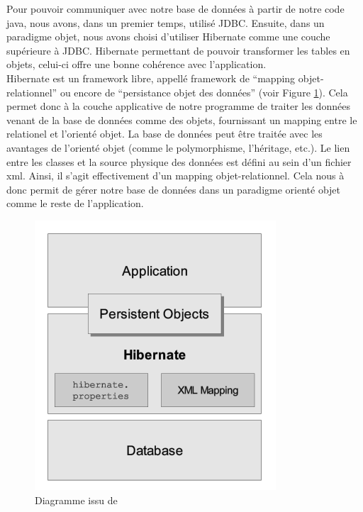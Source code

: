 Pour pouvoir communiquer avec notre base de données à partir de notre code java, nous avons, dans un premier temps, utilisé JDBC. Ensuite, dans un paradigme objet, nous avons  choisi d'utiliser Hibernate comme une couche supérieure à JDBC. Hibernate permettant de pouvoir transformer les tables en objets, celui-ci offre une bonne cohérence avec l'application.\\
\newline
\indent
Hibernate est un framework libre, appellé framework de  \enquote{mapping objet-relationnel} ou encore de \enquote{persistance objet des données} (voir Figure \ref{reference2}). 
\newline
\indent
Cela permet donc à la couche applicative de notre programme de traiter les données venant de la base de données comme des objets, fournissant un mapping entre le relationel et l'orienté objet.
\newline
\indent
 La base de données peut être traitée avec les avantages de l'orienté objet (comme le polymorphisme, l'héritage, etc.). Le lien entre les classes et la source physique des données  est défini au sein d'un fichier xml. Ainsi, il s'agit effectivement d'un mapping objet-relationnel.
 \newline
 \indent
Cela nous à donc permit de gérer notre base de données dans un paradigme orienté objet comme le reste de l'application.
\begin{figure}[!h]
    \center
   	\includegraphics[scale=0.65]{schema_hibernate.png}
   	\caption{Diagramme issu de\url{}}
    \label{reference2}
\end{figure}

